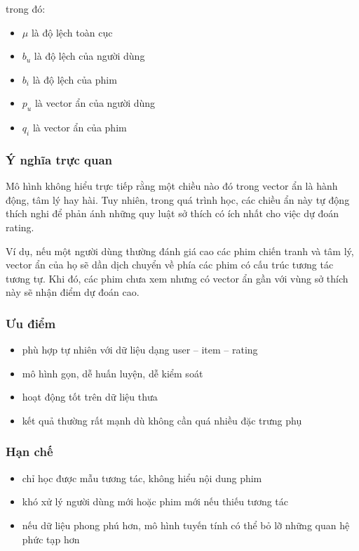 \documentclass[12pt,a4paper]{article}
\begin{document}
trong đó:

\begin{itemize}[leftmargin=1.5cm]
    \item \(\mu\) là độ lệch toàn cục
    \item \(b_u\) là độ lệch của người dùng
    \item \(b_i\) là độ lệch của phim
    \item \(p_u\) là vector ẩn của người dùng
    \item \(q_i\) là vector ẩn của phim
\end{itemize}

\subsubsection{Ý nghĩa trực quan}

Mô hình không hiểu trực tiếp rằng một chiều nào đó trong vector ẩn là hành động, tâm lý hay hài. Tuy nhiên, trong quá trình học, các chiều ẩn này tự động thích nghi để phản ánh những quy luật sở thích có ích nhất cho việc dự đoán rating.

Ví dụ, nếu một người dùng thường đánh giá cao các phim chiến tranh và tâm lý, vector ẩn của họ sẽ dần dịch chuyển về phía các phim có cấu trúc tương tác tương tự. Khi đó, các phim chưa xem nhưng có vector ẩn gần với vùng sở thích này sẽ nhận điểm dự đoán cao.

\subsubsection{Ưu điểm}

\begin{itemize}[leftmargin=1.5cm]
    \item phù hợp tự nhiên với dữ liệu dạng user -- item -- rating
    \item mô hình gọn, dễ huấn luyện, dễ kiểm soát
    \item hoạt động tốt trên dữ liệu thưa
    \item kết quả thường rất mạnh dù không cần quá nhiều đặc trưng phụ
\end{itemize}

\subsubsection{Hạn chế}

\begin{itemize}[leftmargin=1.5cm]
    \item chỉ học được mẫu tương tác, không hiểu nội dung phim
    \item khó xử lý người dùng mới hoặc phim mới nếu thiếu tương tác
    \item nếu dữ liệu phong phú hơn, mô hình tuyến tính có thể bỏ lỡ những quan hệ phức tạp hơn
\end{itemize}
\end{document}
